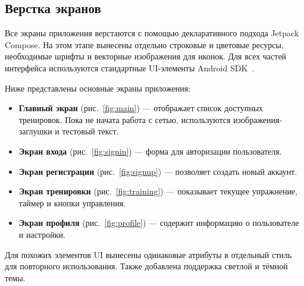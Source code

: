 \subsection{Верстка экранов}

Все экраны приложения верстаются с помощью декларативного подхода Jetpack Compose. На этом этапе вынесены отдельно строковые и цветовые ресурсы, необходимые шрифты и векторные изображения для иконок. Для всех частей интерфейса используются стандартные UI-элементы Android SDK~\cite{refh}\cite{refb}.

Ниже представлены основные экраны приложения:
\begin{itemize}
    \item \textbf{Главный экран} (рис.~\ref{fig:main}) — отображает список доступных тренировок. Пока не начата работа с сетью, используются изображения-заглушки и тестовый текст.
    \item \textbf{Экран входа} (рис.~\ref{fig:signin}) — форма для авторизации пользователя.
    \item \textbf{Экран регистрации} (рис.~\ref{fig:signup}) — позволяет создать новый аккаунт.
    \item \textbf{Экран тренировки} (рис.~\ref{fig:training}) — показывает текущее упражнение, таймер и кнопки управления.
    \item \textbf{Экран профиля} (рис.~\ref{fig:profile}) — содержит информацию о пользователе и настройки.
\end{itemize}

Для похожих элементов UI вынесены одинаковые атрибуты в отдельный стиль для повторного использования. Также добавлена поддержка светлой и тёмной темы.

